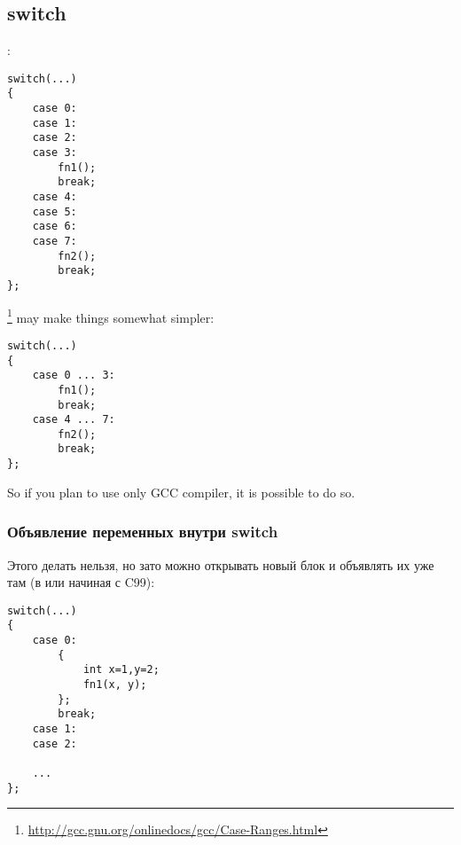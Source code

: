 ﻿\subsection{switch}

:

\begin{lstlisting}
switch(...)
{
	case 0:
	case 1:
	case 2:
	case 3:
		fn1();
		break;
	case 4:
	case 5:
	case 6:
	case 7:
		fn2();
		break;
};
\end{lstlisting}

\footnote{\url{http://gcc.gnu.org/onlinedocs/gcc/Case-Ranges.html}} 
{may make things somewhat simpler}:

\begin{lstlisting}
switch(...)
{
	case 0 ... 3:
		fn1();
		break;
	case 4 ... 7:
		fn2();
		break;
};
\end{lstlisting}

{So if you plan to use only \ac{GCC} compiler, it is possible to do so}.

\subsubsection{Объявление переменных внутри switch}

Этого делать нельзя, но зато можно открывать новый блок и объявлять их уже там (в \CPP или начиная с C99):

\begin{lstlisting}
switch(...)
{
	case 0:
		{
			int x=1,y=2;
			fn1(x, y);
		};
		break;
	case 1:
	case 2:

	...
};
\end{lstlisting}

